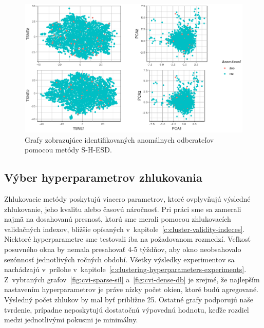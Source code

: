 \documentclass[a4paper,twoside,slovak,12pt,appendix]{article}
\begin{document}
\begin{figure}
  \centering
  \includegraphics[width=\textwidth]{twitter_visualization.png}
  \caption{Grafy zobrazujúce identifikovaných anomálnych odberateľov pomocou metódy S-H-ESD.}
  \label{fig:twitter-results}
\end{figure}

\subsection{Výber hyperparametrov zhlukovania}
Zhlukovacie metódy poskytujú viacero parametrov, ktoré ovplyvňujú výsledné
zhlukovanie, jeho kvalitu alebo časovú náročnosť. Pri práci sme sa zamerali
najmä na dosahovanú presnosť, ktorú sme merali pomocou zhlukovacích validačných
indexov, bližšie opísaných v~kapitole~\ref{c:cluster-validity-indeces}. Niektoré
hyperparametre sme testovali iba na požadovanom rozmedzí. Veľkosť posuvného okna
by nemala presahovať 4-5 týždňov, aby okno neobsahovalo sezónnosť jednotlivých
ročných období. Všetky výsledky experimentov sa nachádzajú v~prílohe
v~kapitole~\ref{c:clustering-hyperparameters-experiments}. Z~vybraných
grafov~\ref{fig:cvi-sparse-sil} a~\ref{fig:cvi-dense-db} je zrejmé, že najlepším
nastavením hyperparametrov je práve nízky počet okien, ktoré budú agregované.
Výsledný počet zhlukov by mal byť približne 25. Ostatné grafy podporujú naše
tvrdenie, prípadne neposkytujú dostatočnú výpovednú hodnotu, keďže rozdiel
medzi jednotlivými pokusmi je minimálny.
\end{document}
